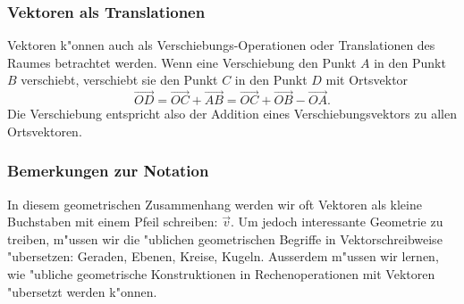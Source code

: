 \subsubsection{Vektoren als Translationen}
Vektoren k"onnen auch als Verschiebungs-Operationen  oder Translationen
des Raumes betrachtet werden.
Wenn eine Verschiebung den Punkt $A$ in den Punkt $B$ verschiebt,
verschiebt sie den Punkt $C$ in den Punkt $D$ mit Ortsvektor
\[
\overrightarrow{OD}
=
\overrightarrow{OC}+\overrightarrow{AB}
=
\overrightarrow{OC}+\overrightarrow{OB}-\overrightarrow{OA}.
\]
Die Verschiebung entspricht also der Addition eines Verschiebungsvektors
zu allen Ortsvektoren.

\subsubsection{Bemerkungen zur Notation}
In diesem geometrischen Zusammenhang werden wir oft Vektoren als
kleine Buchstaben mit einem Pfeil schreiben: $\vec v$. Um jedoch interessante
Geometrie zu treiben, m"ussen wir die "ublichen geometrischen Begriffe in
Vektorschreibweise "ubersetzen: Geraden, Ebenen, Kreise, Kugeln. Ausserdem
m"ussen wir lernen, wie "ubliche geometrische Konstruktionen in 
Rechenoperationen mit Vektoren "ubersetzt werden k"onnen.

